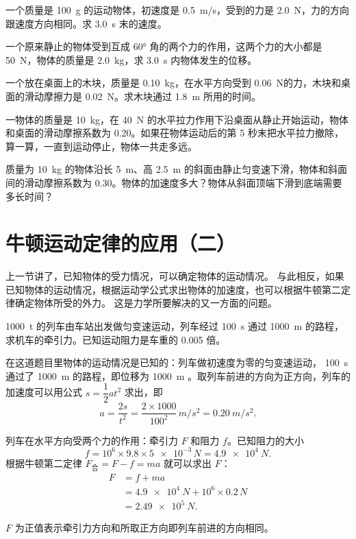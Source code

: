 \begin{Practice}
\begin{question}
\item 一个质量是 \qty{100}{g} 的运动物体，初速度是 \qty{0.5}{m/s}，受到的力是 \qty{2.0}{N}，力的方向跟速度方向相同。求 \qty{3.0}{s} 末的速度。
\item 一个原来静止的物体受到互成 \ang{60} 角的两个力的作用，这两个力的大小都是\qty{50}{N}，物体的质量是 \qty{2.0}{kg}，求 \qty{3.0}{s} 内物体发生的位移。
\item 一个放在桌面上的木块，质量是 \qty{0.10}{kg}，在水平方向受到 \qty{0.06}{N}的力，木块和桌面的滑动摩擦力是 \qty{0.02}{N}。求木块通过 \qty{1.8}{m} 所用的时间。
\item 一物体的质量是 \qty{10}{kg}，在 \qty{40}{N} 的水平拉力作用下沿桌面从静止开始运动，物体和桌面的滑动摩擦系数为 0.20。如果茌物体运动后的第 5 秒末把水平拉力撤除，算一算，一直到运动停止，物体一共走多远。
\item  质量为 \qty{10}{kg} 的物体沿长 \qty{5}{m}、高 \qty{2.5}{m} 的斜面由静止匀变速下滑，物体和斜面间的滑动摩擦系数为 0.30。物体的加速度多大？物体从斜面顶端下滑到底端需要多长时间？
\end{question}
\end{Practice}

\section{牛顿运动定律的应用（二）}
上一节讲了，已知物体的受力情况，可以确定物体的运动情况。
与此相反，如果已知物体的运动情况，根据运动学公式求出物体的加速度，也可以根据牛顿第二定律确定物体所受的外力。
这是力学所要解决的又一方面的问题。

\begin{example}
\qty{1000}{t} 的列车由车站出发做匀变速运动，列车经过 \qty{100}{s} 通过 \qty{1000}{m} 的路程，求机车的牵引力。已知运动阻力是车重的 0.005 倍。
\end{example}

\begin{solution}
在这道题目里物体的运动情况是已知的：列车做初速度为零的匀变速运动， \qty{100}{s} 通过了 \qty{1000}{m} 的路程，即位移为 \qty{1000}{m} 。取列车前进的方向为正方向，列车的加速度可以用公式 $s=\dfrac{1}{2}at^2$ 求出，即
\[a=\frac{2s}{t^2}=\frac{2\times 1000}{100^2}\,\unit{m/s^2} = \qty{0.20}{m/s^2}. \]

列车在水平方向受两个力的作用：牵引力 $F$ 和阻力 $f$。已知阻力的大小
\[f=10^6\times 9.8\times\num{5e-3}\,\unit{N}=\qty{4.9e4}{N}.\]
根据牛顿第二定律 $F_{\text{合}}=F-f=ma$ 就可以求出 $F$：
\[\begin{split}
F&=f+ma\\
&=\qty{4.9e4}{N}+10^6\times 0.2\,\unit{N}\\
&=\qty{2.49e5}{N}.
\end{split} \]

$F$ 为正值表示牵引力方向和所取正方向即列车前进的方向相同。
\end{solution}


